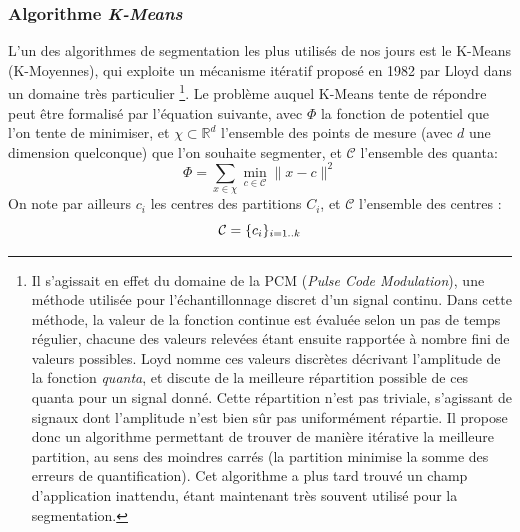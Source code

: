 \subsubsection{Algorithme \textit{K-Means}} \label{sec:ch5_kmeans}
L'un des algorithmes de segmentation les plus utilisés de nos jours est le K-Means (\og K-Moyennes\fg{}), qui exploite un mécanisme itératif proposé en 1982 par Lloyd dans un domaine très particulier \cite{Lloyd1982} \footnote{Il s'agissait en effet du domaine de la PCM (\emph{Pulse Code Modulation}), une méthode utilisée pour l'échantillonnage discret d'un signal continu. Dans cette méthode, la valeur de la fonction continue est évaluée selon un pas de temps régulier, chacune des valeurs relevées étant ensuite rapportée à nombre fini de valeurs possibles. Loyd nomme ces valeurs discrètes décrivant l'amplitude de la fonction \emph{quanta}, et discute de la meilleure répartition possible de ces quanta pour un signal donné. Cette répartition n'est pas triviale, s'agissant de signaux dont l'amplitude n'est bien sûr pas uniformément répartie. Il propose donc un algorithme permettant de trouver de manière itérative la meilleure partition, au sens des moindres carrés (la partition minimise la somme des erreurs de quantification). Cet algorithme a plus tard trouvé un champ d'application inattendu, étant maintenant très souvent utilisé pour la segmentation.}. Le problème auquel K-Means tente de répondre peut être formalisé par l'équation suivante, avec $\Phi$ la fonction de potentiel que l'on tente de minimiser, et $\chi \subset \mathbb{R}^d$ l'ensemble des points de mesure (avec $d$ une dimension quelconque) que l'on souhaite segmenter, et $\mathcal{C}$ l'ensemble des quanta:
\begin{equation}
	\Phi = \sum\limits_{x \in \chi} \min_{c \in \mathcal{C}} \lVert x - c \rVert^2
\end{equation}
On note par ailleurs $c_i$ les centres des partitions $C_i$, et $\mathcal{C}$ l'ensemble des centres :
\begin{equation}
	\mathcal{C} = \{c_i \}_{i=1..k} \\
\end{equation}

